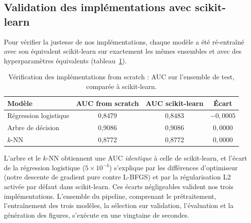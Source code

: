\subsection{Validation des implémentations avec scikit-learn}

Pour vérifier la justesse de nos implémentations, chaque modèle a été
ré-entraîné avec son équivalent scikit-learn sur exactement les mêmes ensembles
et avec des hyperparamètres équivalents (tableau~\ref{tab:sklearn}).

\begin{table}[H]
  \centering
  \caption{Vérification des implémentations from scratch : AUC sur l'ensemble
    de test, comparée à scikit-learn.}
  \label{tab:sklearn}
  \begin{tabular}{lccc}
    \toprule
    \textbf{Modèle} & \textbf{AUC from scratch} & \textbf{AUC scikit-learn}
      & \textbf{Écart} \\
    \midrule
    Régression logistique & 0,8479 & 0,8483 & $-0{,}0005$ \\
    Arbre de décision     & 0,9086 & 0,9086 & $0{,}0000$ \\
    $k$-NN                & 0,8772 & 0,8772 & $0{,}0000$ \\
    \bottomrule
  \end{tabular}
\end{table}

L'arbre et le $k$-NN obtiennent une AUC \emph{identique} à celle de
scikit-learn, et l'écart de la régression logistique ($5 \times 10^{-4}$)
s'explique par les différences d'optimiseur (notre descente de gradient pure
contre L-BFGS) et par la régularisation L2 activée par défaut dans
scikit-learn. Ces écarts négligeables valident nos trois implémentations.
L'ensemble du pipeline, comprenant le prétraitement, l'entraînement des trois
modèles, la sélection sur validation, l'évaluation et la génération des figures,
s'exécute en une vingtaine de secondes.
